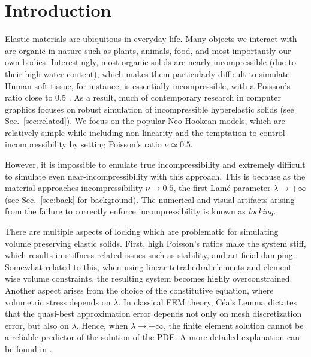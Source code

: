 
\chapter{Introduction}
\label{ch:Introduction}

Elastic materials are ubiquitous in everyday life. Many objects we
interact with are organic in nature such as plants, animals, food, and
most importantly our own bodies. Interestingly, most organic solids
are nearly incompressible (due to their high water content), which
makes them particularly difficult to simulate. Human soft tissue, for
instance, is essentially incompressible, with a Poisson's ratio close
to 0.5 \cite{fung2013biomechanics}. As a result, much of contemporary
research in computer graphics focuses on robust simulation of
incompressible hyperelastic solids (see Sec.~\ref{sec:related}). We
focus on the popular Neo-Hookean models, which are relatively simple
while including non-linearity and the temptation to control
incompressibility by setting Poisson's ratio $\nu \simeq 0.5$.


However, it is impossible to emulate true incompressibility and
extremely difficult to simulate even near-incompressibility with this
approach.  This is because as the material approaches
incompressibility $\nu \rightarrow 0.5$, the first Lam\'e parameter
$\lambda \rightarrow +\infty$ (see Sec.~\ref{sec:back} for
background). The numerical and visual artifacts arising from the failure
to correctly enforce incompressibility is known as {\em locking.}

There are multiple aspects of locking which are problematic for
simulating volume preserving elastic solids.  First, high Poisson's
ratios make the system stiff, which results in stiffness related
issues such as stability, and artificial damping.  Somewhat related to
this, when using linear tetrahedral elements and element-wise volume
constraints, the resulting system becomes highly overconstrained.
Another aspect
arises from the choice of the constitutive equation, where volumetric
stress depends on $\lambda$.  In classical FEM theory, C\'ea's Lemma
dictates that the quasi-best approximation error depends not only on
mesh discretization error, but also on $\lambda$. Hence, when
$\lambda \rightarrow +\infty$, the finite element solution cannot be a
reliable predictor of the solution of the PDE. A more detailed
explanation can be found in \cite{Braess:2007}.

